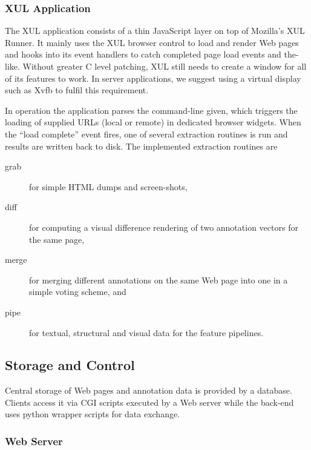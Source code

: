 \subsubsection{XUL Application \label{app}}

The XUL application consists of a thin JavaScript layer on top of Mozilla's XUL Runner.
It mainly uses the XUL browser control to load and render Web pages and hooks into its event handlers to catch completed page load events and the-like.
Without greater C level patching, XUL still needs to create a window for all of its features to work.
In server applications, we suggest using a virtual display such as Xvfb to fulfil this requirement.

In operation the application parses the command-line given, which triggers the loading of supplied URLs (local or remote) in dedicated browser widgets.
When the ``load complete'' event fires, one of several extraction routines is run and results are written back to disk.
The implemented extraction routines are 
\begin{description}
\item[grab] for simple HTML dumps and screen-shots,
\item[diff] for computing a visual difference rendering of two annotation vectors for the same page,
\item[merge\label{merge}] for merging different annotations on the same Web page into one in a simple voting scheme, and
\item[pipe] for textual, structural and visual data for the feature pipelines.
\end{description}

\subsection{Storage and Control\label{server}}

Central storage of Web pages and annotation data is provided by a database.
Clients access it via CGI scripts executed by a Web server while the back-end uses python wrapper scripts for data exchange.

\subsubsection{Web Server\label{webs}}

